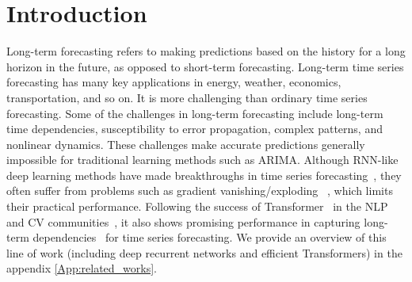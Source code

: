 \documentclass{article}
\begin{document}
\section{Introduction}\label{sec_intro}
Long-term forecasting refers to making predictions based on the history for a long horizon in the future, as opposed to short-term forecasting. Long-term time series forecasting has many key applications in energy, weather, economics, transportation, and so on. It is more challenging than ordinary time series forecasting.
Some of the challenges in long-term forecasting include long-term time dependencies, susceptibility to error propagation, complex patterns, and nonlinear dynamics. These challenges make accurate predictions generally impossible for traditional learning methods such as ARIMA.
Although RNN-like deep learning methods have made breakthroughs in time series forecasting~\cite{deep-state-space-models-for-time-series-forecasting,DBLP:journals/corr/FlunkertSG17-deepAR}, they often suffer from problems such as gradient vanishing/exploding ~\cite{DBLP:icml/On-the-difficult-gradient-vanishing-explode}, which limits their practical performance. Following the success of Transformer~\cite{attention_is_all_you_need} in the NLP and CV communities~\cite{attention_is_all_you_need,Bert/NAACL/Jacob,Transformers-for-image-at-scale/iclr/DosovitskiyB0WZ21,DBLP:Global-filter-FNO-in-cv}, it also shows promising performance in capturing long-term dependencies~\cite{haoyietal-informer-2021, Autoformer, FedFormer, wen2022transformers} for time series forecasting. We provide an overview of this line of work (including deep recurrent networks and efficient Transformers) in the appendix \ref{App:related_works}.
\end{document}
